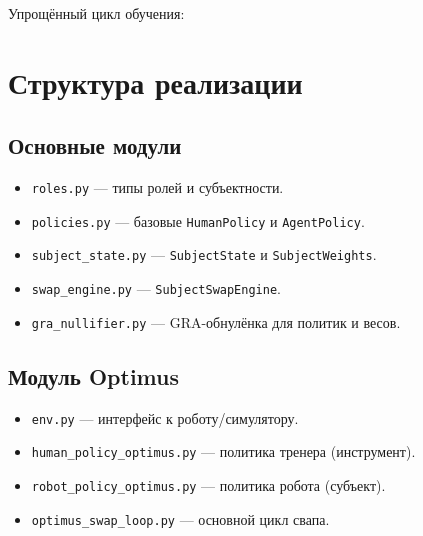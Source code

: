 \documentclass[11pt,a4paper]{article}
\begin{document}
Упрощённый цикл обучения:

\begin{algorithmic}
\step
{}
\end{algorithmic}

\section{Структура реализации}

\subsection{Основные модули}

\begin{itemize}
\item \texttt{roles.py} — типы ролей и субъектности.
\item \texttt{policies.py} — базовые \texttt{HumanPolicy} и \texttt{AgentPolicy}.
\item \texttt{subject_state.py} — \texttt{SubjectState} и \texttt{SubjectWeights}.
\item \texttt{swap_engine.py} — \texttt{SubjectSwapEngine}.
\item \texttt{gra_nullifier.py} — GRA-обнулёнка для политик и весов.
\end{itemize}

\subsection{Модуль Optimus}

\begin{itemize}
\item \texttt{env.py} — интерфейс к роботу/симулятору.
\item \texttt{human_policy_optimus.py} — политика тренера (инструмент).
\item \texttt{robot_policy_optimus.py} — политика робота (субъект).
\item \texttt{optimus_swap_loop.py} — основной цикл свапа.
\end{itemize}
\end{document}
